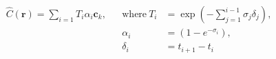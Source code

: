 \begin{align} \label{eq:numerical-quadrature-loss}
    \hat{C}(\pmb{r}) = \sum_{i=1}T_i \alpha_i \pmb{c}_k, && \text{where}~T_i &= \exp{(-\sum_{j=1}^{i-1} \sigma_j \delta_j)},  \\ 
    && \alpha_i &= (1-e^{-\sigma_i}), \\ 
    && \delta_i &= t_{i+1} - t_i
\end{align}